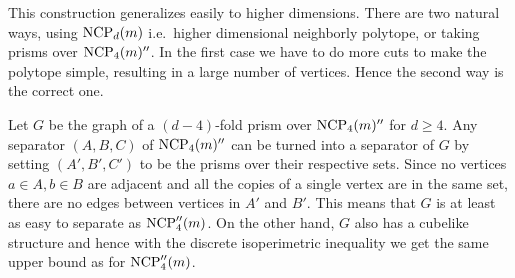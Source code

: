 This construction generalizes easily to higher dimensions. There are two 
natural ways, using $\textrm{NCP}_d(m)$ i.e.\ higher dimensional neighborly polytope, or 
taking prisms over $\textrm{NCP}_4(m)''$.  In the first case we have to do more cuts to 
make the polytope simple, resulting in a large number of vertices. Hence the 
second way is the correct one. 

Let $G$ be the graph of a $(d-4)$-fold prism over $\textrm{NCP}_4(m)''$ for $d\geq 4$. 
Any separator 
$(A,B,C)$ of $\textrm{NCP}_4(m)''$ can be turned into a separator of $G$ by setting 
$(A',B',C')$ to be the prisms over their respective sets. Since no vertices 
$a\in A, b\in B$ are adjacent and all the copies of a single vertex are in the 
same set, there are no edges between vertices in $A'$ and $B'$. This means that 
$G$ is at least as easy to separate as $\textrm{NCP}''_4(m)$. On the other hand, $G$ 
also has a cubelike structure and hence with the discrete isoperimetric 
inequality we get the same upper bound as for $\textrm{NCP}''_4(m)$. 




